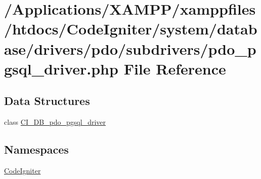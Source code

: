 \hypertarget{pdo__pgsql__driver_8php}{}\section{/\+Applications/\+X\+A\+M\+P\+P/xamppfiles/htdocs/\+Code\+Igniter/system/database/drivers/pdo/subdrivers/pdo\+\_\+pgsql\+\_\+driver.php File Reference}
\label{pdo__pgsql__driver_8php}
\subsection*{Data Structures}
\begin{DoxyCompactItemize}
\item 
class \mbox{\hyperlink{class_c_i___d_b__pdo__pgsql__driver}{C\+I\+\_\+\+D\+B\+\_\+pdo\+\_\+pgsql\+\_\+driver}}
\end{DoxyCompactItemize}
\subsection*{Namespaces}
\begin{DoxyCompactItemize}
\item 
 \mbox{\hyperlink{namespace_code_igniter}{Code\+Igniter}}
\end{DoxyCompactItemize}
